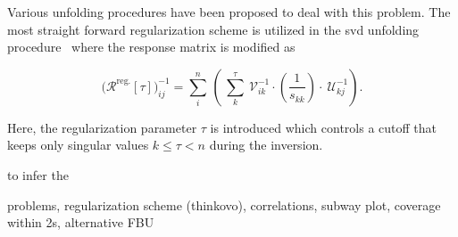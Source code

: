 Various unfolding procedures have been proposed to deal with this problem. The most straight forward regularization scheme is utilized in the \gls{svd} unfolding procedure~\cite{Hocker:1995kb} where the response matrix is modified as 

\begin{equation}
\Big(\mathcal{R}^\mathrm{reg.}[\tau]\Big)^{-1}_{ ij}=\sum_{i}^{n}\,\left(\,\sum_{k}^{\tau}~\mathcal{V}^{-1}_{ik}\cdot\left(\frac{1}{s_{kk}}\right)\cdot~\mathcal{U}^{-1}_{kj}\right).
\end{equation}

Here, the regularization parameter $\tau$ is introduced which controls a cutoff that keeps only singular values $k\leq\tau<n$ during the inversion.




to infer the 

problems, regularization scheme (thinkovo), correlations, subway plot, coverage within 2s, alternative FBU


